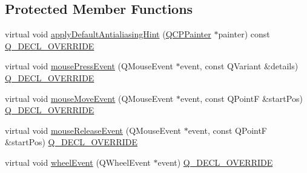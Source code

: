 \subsection*{Protected Member Functions}
\begin{DoxyCompactItemize}
\item 
virtual void \hyperlink{class_q_c_p_color_scale_af1b24d24a70f25b65d29f09e413390a8}{apply\+Default\+Antialiasing\+Hint} (\hyperlink{class_q_c_p_painter}{Q\+C\+P\+Painter} $\ast$painter) const \hyperlink{qcustomplot_8h_a42cc5eaeb25b85f8b52d2a4b94c56f55}{Q\+\_\+\+D\+E\+C\+L\+\_\+\+O\+V\+E\+R\+R\+I\+DE}
\item 
virtual void \hyperlink{class_q_c_p_color_scale_a91f633b97ffcd57fdf8cd814974c20e6}{mouse\+Press\+Event} (Q\+Mouse\+Event $\ast$event, const Q\+Variant \&details) \hyperlink{qcustomplot_8h_a42cc5eaeb25b85f8b52d2a4b94c56f55}{Q\+\_\+\+D\+E\+C\+L\+\_\+\+O\+V\+E\+R\+R\+I\+DE}
\item 
virtual void \hyperlink{class_q_c_p_color_scale_a3b2bd79725aefaf2630fc76e90939442}{mouse\+Move\+Event} (Q\+Mouse\+Event $\ast$event, const Q\+PointF \&start\+Pos) \hyperlink{qcustomplot_8h_a42cc5eaeb25b85f8b52d2a4b94c56f55}{Q\+\_\+\+D\+E\+C\+L\+\_\+\+O\+V\+E\+R\+R\+I\+DE}
\item 
virtual void \hyperlink{class_q_c_p_color_scale_a6a35dd39ab4e5cb2d7b29ebb4d5b61b0}{mouse\+Release\+Event} (Q\+Mouse\+Event $\ast$event, const Q\+PointF \&start\+Pos) \hyperlink{qcustomplot_8h_a42cc5eaeb25b85f8b52d2a4b94c56f55}{Q\+\_\+\+D\+E\+C\+L\+\_\+\+O\+V\+E\+R\+R\+I\+DE}
\item 
virtual void \hyperlink{class_q_c_p_color_scale_a63cf19be184f6670c9495ad3a9a1baeb}{wheel\+Event} (Q\+Wheel\+Event $\ast$event) \hyperlink{qcustomplot_8h_a42cc5eaeb25b85f8b52d2a4b94c56f55}{Q\+\_\+\+D\+E\+C\+L\+\_\+\+O\+V\+E\+R\+R\+I\+DE}
\end{DoxyCompactItemize}
